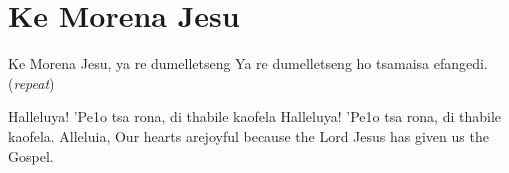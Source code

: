 \starttocol
\chapter{Ke Morena Jesu}
\nexttocol
\hfill{\it }
\stoptocol
\starttocol
\startlines
{\sc Ke} Morena Jesu, ya re dumelletseng
Ya re dumelletseng ho tsamaisa efangedi.
          \hfill({\it repeat})~~~~~~~~~

Halleluya! 'Pe1o tsa rona, di thabile kaofela
Halleluya! 'Pe1o tsa rona, di thabile kaofela.
\stoplines
\nexttocol
Alleluia, Our hearts arejoyful because the
Lord Jesus has given us the Gospel.
\stoptocol

